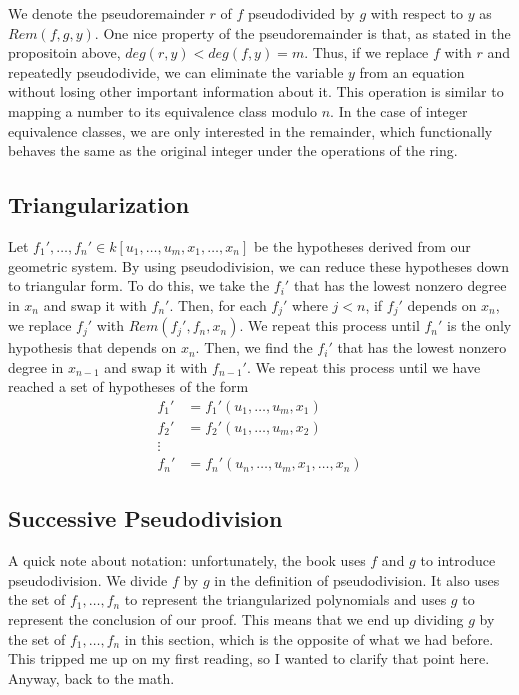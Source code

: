 \documentclass{article}
\theoremstyle{plain}
\theoremstyle{definition}
\theoremstyle{remark}
\begin{document}
We denote the pseudoremainder $r$ of $f$ pseudodivided by $g$ with respect to $y$ as $Rem(f,g,y)$.
One nice property of the pseudoremainder is that, as stated in the propositoin above, $deg(r,y) < deg(f,y) = m$. 
Thus, if we replace $f$ with $r$ and repeatedly pseudodivide, we can eliminate the variable $y$ from an equation without losing other important information about it. 
This operation is similar to mapping a number to its equivalence class modulo $n$. 
In the case of integer equivalence classes, we are only interested in the remainder, which functionally behaves the same as the original integer under the operations of the ring.

\subsection{Triangularization}
Let $f_1',\dots,f_n' \in k[u_1,\dots,u_m,x_1,\dots,x_n]$ be the hypotheses derived from our geometric system.
By using pseudodivision, we can reduce these hypotheses down to triangular form. To do this, we take the $f_i'$ that has the lowest nonzero degree in $x_n$ and swap it with $f_n'$.
Then, for each $f_j'$ where $j < n$, if $f_j'$ depends on $x_n$, we replace $f_j'$ with $Rem(f_j', f_n, x_n)$. We repeat this process until $f_n'$ is the only hypothesis that depends on $x_n$. 
Then, we find the $f_i'$ that has the lowest nonzero degree in $x_{n-1}$ and swap it with $f_{n-1}'$.
We repeat this process until we have reached a set of hypotheses of the form
\begin{align*}
    f_1' & = f_1'(u_1,\dots,u_m,x_1)\\
    f_2' & = f_2'(u_1,\dots,u_m,x_2)\\
    \vdots & \\
    f_n' & = f_n'(u_n,\dots,u_m,x_1,\dots,x_n)
\end{align*}

\subsection{Successive Pseudodivision}

A quick note about notation: unfortunately, the book uses $f$ and $g$ to introduce pseudodivision. We divide $f$ by $g$ in the definition of pseudodivision.
It also uses the set of $f_1,\dots,f_n$ to represent the triangularized polynomials and uses $g$ to represent the conclusion of our proof.
This means that we end up dividing $g$ by the set of $f_1,\dots,f_n$ in this section, which is the opposite of what we had before. 
This tripped me up on my first reading, so I wanted to clarify that point here. Anyway, back to the math.
\end{document}
